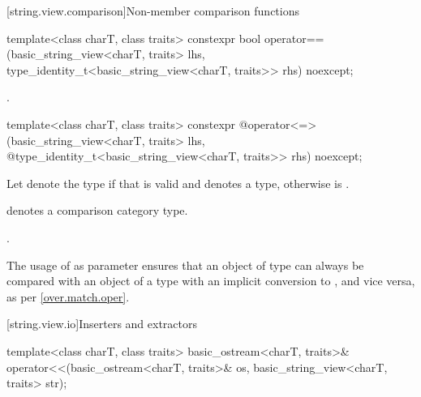 [string.view.comparison]{Non-member comparison functions}

%
\begin{itemdecl}
template<class charT, class traits>
  constexpr bool operator==(basic_string_view<charT, traits> lhs,
                            type_identity_t<basic_string_view<charT, traits>> rhs) noexcept;
\end{itemdecl}

\begin{itemdescr}
\pnum
\returns
{}.
\end{itemdescr}

%
\begin{itemdecl}
template<class charT, class traits>
  constexpr @\seebelow@ operator<=>(basic_string_view<charT, traits> lhs,
            @\itcorr@                      type_identity_t<basic_string_view<charT, traits>> rhs) noexcept;
\end{itemdecl}

\begin{itemdescr}
\pnum
Let  denote the type  if
that  is valid and denotes a type,
otherwise  is .

\pnum
\mandates
{} denotes a comparison category type.

\pnum
\returns
{}.

\pnum
\begin{note}
The usage of  as parameter
ensures that an object of type 
can always be compared with an object of a type  with
an implicit conversion to , and
vice versa, as per \ref{over.match.oper}.
\end{note}
\end{itemdescr}

[string.view.io]{Inserters and extractors}

%
\begin{itemdecl}
template<class charT, class traits>
  basic_ostream<charT, traits>&
    operator<<(basic_ostream<charT, traits>& os, basic_string_view<charT, traits> str);
\end{itemdecl}

